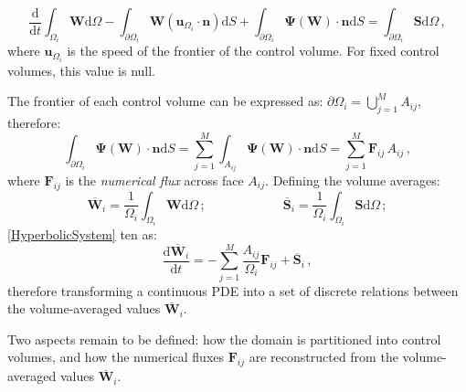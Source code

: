 \documentclass[11pt, a4paper, oneside, openany]{book}
\begin{document}
\begin{equation}
\dfrac{\mathrm{d}}{\mathrm{d}t}\int_{\Omega_{i}}\boldsymbol{W}\mathrm{d}\Omega-\int_{\partial\Omega_{i}}\boldsymbol{W}\left(\boldsymbol{u}_{\Omega_{i}}\cdot\boldsymbol{n}\right)\mathrm{d}S+\int_{\partial\Omega_{i}}\boldsymbol{\Psi}\left(\boldsymbol{W}\right)\cdot\boldsymbol{n}\mathrm{d}S=\int_{\partial\Omega_{i}}\boldsymbol{S}\mathrm{d}\Omega\,,
\end{equation}
where $\boldsymbol{u}_{\Omega_{i}}$ is the speed of the frontier of the control volume. For fixed control volumes, this value is null.\par
The frontier of each control volume can be expressed as: $\partial\Omega_{i}=\bigcup_{j=1}^{M}A_{ij}$, therefore:
\begin{equation*}
\int_{\partial\Omega_{i}}\boldsymbol{\Psi}\left(\boldsymbol{W}\right)\cdot\boldsymbol{n}\mathrm{d}S=\sum_{j=1}^{M}\int_{A_{ij}}\boldsymbol{\Psi}\left(\boldsymbol{W}\right)\cdot\boldsymbol{n}\mathrm{d}S=\sum_{j=1}^{M}\boldsymbol{F}_{ij}\,A_{ij}\,,
\end{equation*}
where $\boldsymbol{F}_{ij}$ is the \textit{numerical flux} across face $A_{ij}$. Defining the volume averages:
\begin{equation*}
\boldsymbol{\overline{W}}_{i}=\dfrac{1}{\Omega_i}\int_{\Omega_{i}}\boldsymbol{W}\mathrm{d}\Omega\,;\qquad\qquad\qquad\boldsymbol{\overline{S}}_{i}=\dfrac{1}{\Omega_i}\int_{\Omega_{i}}\boldsymbol{S}\mathrm{d}\Omega\,;
\end{equation*}
\eqref{HyperbolicSystem} 
ten as:
\begin{equation}
\dfrac{\mathrm{d}\boldsymbol{\overline{W}}_{i}}{\mathrm{d}t}=-\sum_{j=1}^{M}\dfrac{A_{ij}}{\Omega_{i}}\boldsymbol{F}_{ij}+\boldsymbol{\overline{S}}_{i}\,,\label{HyperbolicCVDiscrete}
\end{equation}
therefore transforming a continuous PDE into a set of discrete relations between the volume-averaged values $\overline{\boldsymbol{W}}_{i}$.\par
Two aspects remain to be defined: how the domain is partitioned into control volumes, and how the numerical fluxes $\boldsymbol{F}_{ij}$ are reconstructed from the volume-averaged values $\overline{\boldsymbol{W}}_{i}$.
\end{document}
